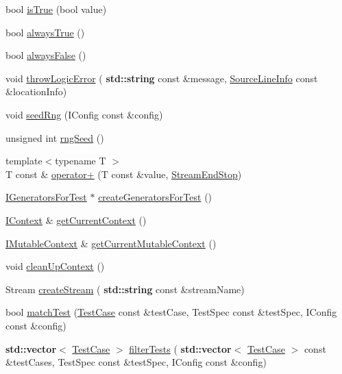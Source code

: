 \begin{DoxyCompactItemize}
\item 
bool \hyperlink{namespace_catch_ae3bc6c6677e64e6eaa720dc3add31852}{is\+True} (bool value)
\item 
bool \hyperlink{namespace_catch_a129be2186a2f6546206ec52c4bf2156f}{always\+True} ()
\item 
bool \hyperlink{namespace_catch_ad425271249dd02956a9709e78b8b2783}{always\+False} ()
\item 
void \hyperlink{namespace_catch_a702b612f683d154c466ea8297ed4a20d}{throw\+Logic\+Error} (\textbf{ std\+::string} const \&message, \hyperlink{struct_catch_1_1_source_line_info}{Source\+Line\+Info} const \&location\+Info)
\item 
void \hyperlink{namespace_catch_a161400810eb0995394d6d8d3cae821ad}{seed\+Rng} (I\+Config const \&config)
\item 
unsigned int \hyperlink{namespace_catch_acf5ea05e942d2d7fe79111e12754ed76}{rng\+Seed} ()
\item 
{\footnotesize template$<$typename T $>$ }\\T const  \& \hyperlink{namespace_catch_a5e95b3c47a7618db3649dc39b0bb9004}{operator+} (T const \&value, \hyperlink{struct_catch_1_1_stream_end_stop}{Stream\+End\+Stop})
\item 
\hyperlink{struct_catch_1_1_i_generators_for_test}{I\+Generators\+For\+Test} $\ast$ \hyperlink{namespace_catch_a3d93b31e88fd01ee9e0d20757ff64eab}{create\+Generators\+For\+Test} ()
\item 
\hyperlink{struct_catch_1_1_i_context}{I\+Context} \& \hyperlink{namespace_catch_ad517cca9b21deb79101e90e5508dd161}{get\+Current\+Context} ()
\item 
\hyperlink{struct_catch_1_1_i_mutable_context}{I\+Mutable\+Context} \& \hyperlink{namespace_catch_af7bb0c32ab2453d2f53e92a96d15360e}{get\+Current\+Mutable\+Context} ()
\item 
void \hyperlink{namespace_catch_ae50508f10ffc4ed873a31a4db4caea16}{clean\+Up\+Context} ()
\item 
Stream \hyperlink{namespace_catch_ad7591011c5d99d59504ecd3384001c3e}{create\+Stream} (\textbf{ std\+::string} const \&stream\+Name)
\item 
bool \hyperlink{namespace_catch_aadef80fbc6bc84589777a462770cef49}{match\+Test} (\hyperlink{class_catch_1_1_test_case}{Test\+Case} const \&test\+Case, Test\+Spec const \&test\+Spec, I\+Config const \&config)
\item 
\textbf{ std\+::vector}$<$ \hyperlink{class_catch_1_1_test_case}{Test\+Case} $>$ \hyperlink{namespace_catch_ab5da9aa67c42a3f626aea07d0b556829}{filter\+Tests} (\textbf{ std\+::vector}$<$ \hyperlink{class_catch_1_1_test_case}{Test\+Case} $>$ const \&test\+Cases, Test\+Spec const \&test\+Spec, I\+Config const \&config)

\end{DoxyCompactItemize}
